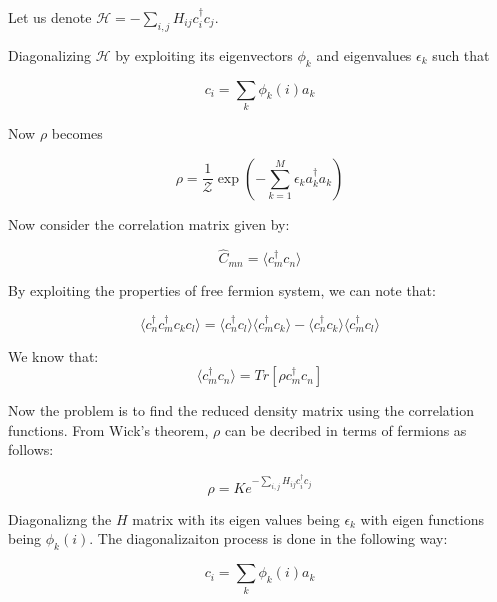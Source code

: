 \documentclass[11pt,a4paper]{article}
\begin{document}
Let us denote $ \mathcal{H} = -\sum_{i,j}H_{ij}c_{i}^\dagger c_{j}  $. 

Diagonalizing $ \mathcal{H} $ by exploiting its eigenvectors $ \phi_{k} $ and eigenvalues $ \epsilon_{k} $   such that 

\begin{equation}\label{key}
c_{i} = \sum_{k} \phi_{k}(i) a_{k}
\end{equation}

Now $ \rho $ becomes 

\begin{equation}\label{kedy}
\rho  = \dfrac{1}{\mathcal{Z}} \exp(-\sum_{k = 1}^{M}\epsilon_{k}a_{k}^\dagger a_{k})
\end{equation}

Now consider the correlation matrix given by:

\begin{equation}
\hat{C}_{mn} = \langle c_{m}^\dagger c_{n}\rangle
\end{equation}



By exploiting the properties of free fermion system, we can note that:

\begin{equation}
\langle c_{n}^\dagger c_{m}^\dagger c_{k}c_{l}\rangle = \langle c_{n}^\dagger c_{l}\rangle \langle c_{m}^\dagger c_{k}\rangle-\langle c_{n}^\dagger c_{k}\rangle \langle c_{m}^\dagger c_{l}\rangle
\end{equation}

We know that:
\begin{equation}
\langle c_{m}^\dagger c_{n}\rangle = Tr[\rho c_{m}^\dagger c_{n}]
\end{equation}

Now the problem is to find the reduced density matrix using the correlation functions. From Wick's theorem, $\rho$ can be decribed in terms of fermions as follows:

\begin{equation}
\rho = K e^{-\sum_{i,j}H_{ij}c_{i}^\dagger c_{j}}
\end{equation}

Diagonalizng the $H$ matrix with its eigen values being $\epsilon_{k}$ with eigen functions being $ \phi_{k} (i)$. The diagonalizaiton process is done in the following way:

\begin{equation}
c_{i} = \sum_{k}\phi_{k}(i)a_{k}
\end{equation}
\end{document}
